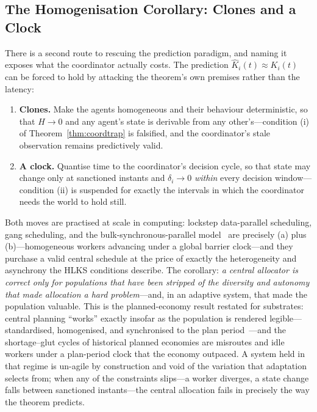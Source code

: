 \documentclass[11pt]{article}
\theoremstyle{definition}
\theoremstyle{plain}
\theoremstyle{plain}
\begin{document}
\subsection{The Homogenisation Corollary: Clones and a Clock}
\label{sec:homogenisation}

There is a second route to rescuing the prediction paradigm, and naming it
exposes what the coordinator actually costs. The prediction
$\hat{K}_i(t) \approx K_i(t)$ can be forced to hold by attacking the
theorem's own premises rather than the latency:

\begin{enumerate}[label=(\alph*)]
\item \textbf{Clones.} Make the agents homogeneous and their behaviour
  deterministic, so that $H \to 0$ and any agent's state is derivable from
  any other's---condition (i) of Theorem~\ref{thm:coordtrap} is falsified,
  and the coordinator's stale observation remains predictively valid.
\item \textbf{A clock.} Quantise time to the coordinator's decision cycle,
  so that state may change only at sanctioned instants and
  $\delta_i \to 0$ \emph{within} every decision window---condition (ii) is
  suspended for exactly the intervals in which the coordinator needs the
  world to hold still.
\end{enumerate}

Both moves are practised at scale in computing: lockstep data-parallel
scheduling, gang scheduling, and the bulk-synchronous-parallel
model~\cite{valiant1990} are precisely (a) plus (b)---homogeneous workers
advancing under a global barrier clock---and they purchase a valid central
schedule at the price of exactly the heterogeneity and asynchrony the HLKS
conditions describe. The corollary: \emph{a central allocator is correct
only for populations that have been stripped of the diversity and autonomy
that made allocation a hard problem}---and, in an adaptive system, that
made the population valuable. This is the planned-economy result restated
for substrates: central planning ``works'' exactly insofar as the
population is rendered legible---standardised, homogenised, and
synchronised to the plan period~\cite{hayek1945,scott1998}---and the
shortage--glut cycles of historical planned economies are misroutes and
idle workers under a plan-period clock that the economy outpaced. A system
held in that regime is un-agile by construction and void of the variation
that adaptation selects from; when any of the constraints slips---a worker
diverges, a state change falls between sanctioned instants---the central
allocation fails in precisely the way the theorem predicts.
\end{document}

